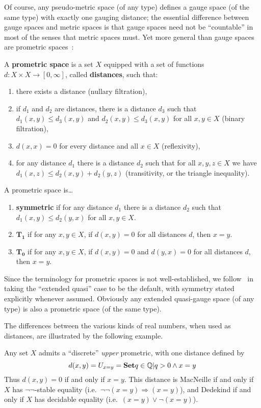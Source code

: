 \documentclass{article}
\def\Q{\mathbb{Q}}
\def\Rp{[0,\infty]}
\let\implies\Rightarrow
\def\nn{\ensuremath{\neg\neg}}
\begin{document}
Of course, any pseudo-metric space (of any type) defines a gauge space (of the same type) with exactly one gauging distance; the essential difference between gauge spaces and metric spaces is that gauge spaces need not be ``countable'' in most of the senses that metric spaces must.
Yet more general than gauge spaces are prometric spaces~\cite{cht:one-setting}:

\begin{defn}
  A \textbf{prometric space} is a set $X$ equipped with a set of functions $d:X\times X\to\Rp$, called \textbf{distances}, such that:
  \begin{enumerate}
  \item there exists a distance (nullary filtration),
  \item if $d_1$ and $d_2$ are distances, there is a distance $d_3$ such that $d_1(x,y)\le d_3(x,y)$ and $d_2(x,y)\le d_3(x,y)$ for all $x,y\in X$ (binary filtration),
  \item $d(x,x)=0$ for every distance and all $x\in X$ (reflexivity),
  \item for any distance $d_1$ there is a distance $d_2$ such that for all $x,y,z\in X$ we have $d_1(x,z)\le d_2(x,y)+d_2(y,z)$ (transitivity, or the triangle inequality).
  \end{enumerate}
  A prometric space is\dots
  \begin{enumerate}[resume]
  \item \textbf{symmetric} if for any distance $d_1$ there is a distance $d_2$ such that $d_1(x,y)\le d_2(y,x)$ for all $x,y\in X$.
  \item $\mathbf{T_1}$ if for any $x,y\in X$, if $d(x,y)=0$ for all distances $d$, then $x=y$.
  \item $\mathbf{T_0}$ if for any $x,y\in X$, if $d(x,y)=0$ and $d(y,x)=0$ for all distances $d$, then $x=y$.
  \end{enumerate}
\end{defn}

Since the terminology for prometric spaces is not well-established, we follow~\cite{cht:one-setting} in taking the ``extended quasi'' case to be the default, with symmetry stated explicitly whenever assumed.
Obviously any extended quasi-gauge space (of any type) is also a prometric space (of the same type).

The differences between the various kinds of real numbers, when used as distances, are illustrated by the following example.

\begin{eg}
  Any set $X$ admits a ``discrete'' \emph{upper} prometric, with one distance defined by
  \[ d(x,y) = U_{x=y} = \setof{ q\in \Q | q > 0 \land x=y} \]
  Thus $d(x,y)=0$ if and only if $x=y$.
  This distance is MacNeille if and only if $X$ has \nn-stable equality (i.e.\ $\neg\neg(x=y)\implies (x=y)$), and Dedekind if and only if $X$ has decidable equality (i.e.\ $(x=y)\lor \neg(x=y)$).
\end{eg}
\end{document}
